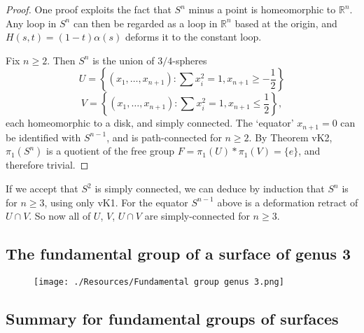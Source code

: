 \documentclass[12pt, a4paper]{article}
\begin{document}
\begin{proof}
    One proof exploits the fact that \(S^n\) minus a point is homeomorphic to \(\mathbb{R}^n\). Any loop in \(S^n\) can then be regarded as a loop in \(\mathbb{R}^n\) based at the origin, and \(H(s, t) = (1 - t)\alpha(s)\) deforms it to the constant loop.
    
    Fix \(n \geq 2\). Then \(S^n\) is the union of \(3/4\)-spheres
\[
U = \left\{ (x_1, \ldots, x_{n+1}) : \sum x_i^2 = 1, x_{n+1} \geq -\frac{1}{2} \right\}
\]
\[
V = \left\{ (x_1, \ldots, x_{n+1}) : \sum x_i^2 = 1, x_{n+1} \leq \frac{1}{2} \right\},
\]
each homeomorphic to a disk, and simply connected. The `equator' \(x_{n+1} = 0\) can be identified with \(S^{n-1}\), and is path-connected for \(n \geq 2\). By Theorem vK2, \(\pi_1(S^n)\) is a quotient of the free group \(F = \pi_1(U) * \pi_1(V) = \{e\}\), and therefore trivial. 

\end{proof}

\begin{mdremark}
    If we accept that \(S^2\) is simply connected, we can deduce by induction that \(S^n\) is for \(n \geq 3\), using only vK1. For the equator \(S^{n-1}\) above is a deformation retract of \(U \cap V\). So now all of \(U\), \(V\), \(U \cap V\) are simply-connected for \(n \geq 3\).
\end{mdremark}

\subsection{The fundamental group of a surface of genus 3}

\begin{figure}[H]
     \begin{center}
         \texttt{[image: ./Resources/Fundamental group genus 3.png]}
     \end{center}
\end{figure}

\subsection{Summary for fundamental groups of surfaces}
\end{document}
